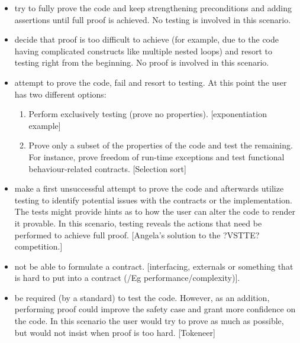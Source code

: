 \documentclass{llncs}
\begin{document}
\begin {itemize}
  \item try to fully prove the code and keep strengthening preconditions
    and adding assertions until full proof is achieved. No testing is
    involved in this scenario.

  \item decide that proof is too difficult to achieve (for example, due
    to the code having complicated constructs like multiple nested
    loops) and resort to testing right from the beginning. No proof
    is involved in this scenario.

  \item attempt to prove the code, fail and resort to testing. At this
    point the user has two different options:

    \begin{enumerate}
      \item Perform exclusively testing (prove no properties).
        [exponentiation example]

      \item Prove only a subset of the properties of the code and
        test the remaining. For instance, prove freedom of run-time
        exceptions and test functional behaviour-related contracts.
        [Selection sort]
    \end{enumerate}

  \item make a first unsuccessful attempt to prove the code and afterwards
    utilize testing to identify potential issues with the contracts or
    the implementation. The tests might provide hints as to how the user
    can alter the code to render it provable. In this scenario, testing
    reveals the actions that need be performed to achieve full proof.
    [Angela's solution to the ?VSTTE? competition.]

  \item not be able to formulate a contract. [interfacing, externals or something
    that is hard to put into a contract (/Eg performance/complexity)].

  \item be required (by a standard) to test the code. However, as an addition,
    performing proof could improve the safety case and grant more confidence on the
    code. In this scenario the user would try to prove as much as possible, but would
    not insist when proof is too hard.
    [Tokeneer]
\end{itemize}
\end{document}
